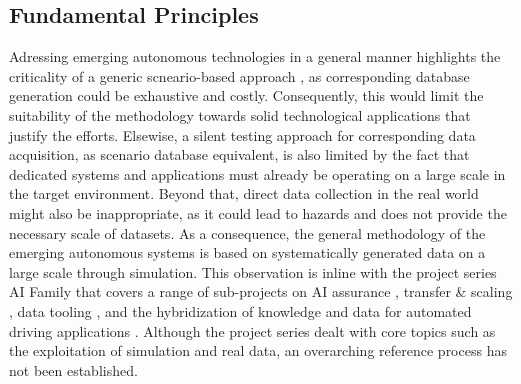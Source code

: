 \subsection{Fundamental Principles}
Adressing emerging autonomous technologies in a general manner highlights the criticality of a generic scneario-based approach \cite{riedmaier2020survey, elster2021fundamental, VVMOverall}, as corresponding database generation could be exhaustive and costly. Consequently, this would limit the suitability of the methodology towards solid technological applications that justify the efforts. Elsewise, a silent testing \cite{Tesla_shadow, templeton2019} approach for corresponding data acquisition, as scenario database equivalent, is also limited by the fact that dedicated systems and applications must already be operating on a large scale in the target environment. Beyond that, direct data collection in the real world might also be inappropriate, as it could lead to hazards and does not provide the necessary scale of datasets. As a consequence, the general methodology of the emerging autonomous systems is based on systematically generated data on a large scale through simulation. This observation is inline with the project series AI Family \cite{KIFamilie} that covers a range of sub-projects on AI assurance \cite{KIAbsicherungSynData}, transfer \& scaling \cite{KIDeltaSynData}, data tooling \cite{KIDataTooling}, and the hybridization of knowledge and data for automated driving applications \cite{KIWissen_D1_D4, KIWissen_D2}. Although the project series dealt with core topics such as the exploitation of simulation and real data, an overarching reference process has not been established. 

